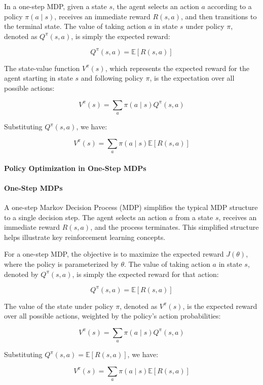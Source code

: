 \documentclass[10pt, oneside]{article}
\theoremstyle{definition}
\begin{document}
In a one-step MDP, given a state $s$, the agent selects an action $a$ according to a policy $\pi(a \mid s)$, receives an immediate reward $R(s, a)$, and then transitions to the terminal state. The value of taking action $a$ in state $s$ under policy $\pi$, denoted as $Q^\pi(s, a)$, is simply the expected reward:

\[
Q^\pi(s, a) = \mathbb{E}[R(s, a)]
\]

The state-value function $V^\pi(s)$, which represents the expected reward for the agent starting in state $s$ and following policy $\pi$, is the expectation over all possible actions:

\[
V^\pi(s) = \sum_{a} \pi(a \mid s) Q^\pi(s, a)
\]

Substituting $Q^\pi(s, a)$, we have:

\[
V^\pi(s) = \sum_{a} \pi(a \mid s) \mathbb{E}[R(s, a)]
\]

\paragraph{Policy Optimization in One-Step MDPs}

\paragraph{One-Step MDPs}

A one-step Markov Decision Process (MDP) simplifies the typical MDP structure to a single decision step. The agent selects an action \( a \) from a state \( s \), receives an immediate reward \( R(s, a) \), and the process terminates. This simplified structure helps illustrate key reinforcement learning concepts.

For a one-step MDP, the objective is to maximize the expected reward \( J(\theta) \), where the policy is parameterized by \( \theta \). The value of taking action \( a \) in state \( s \), denoted by \( Q^\pi(s, a) \), is simply the expected reward for that action:

\[
Q^\pi(s, a) = \mathbb{E}[R(s, a)]
\]

The value of the state under policy \( \pi \), denoted as \( V^\pi(s) \), is the expected reward over all possible actions, weighted by the policy's action probabilities:

\[
V^\pi(s) = \sum_{a} \pi(a \mid s) Q^\pi(s, a)
\]

Substituting \( Q^\pi(s, a) = \mathbb{E}[R(s, a)] \), we have:

\[
V^\pi(s) = \sum_{a} \pi(a \mid s) \mathbb{E}[R(s, a)]
\]
\end{document}
